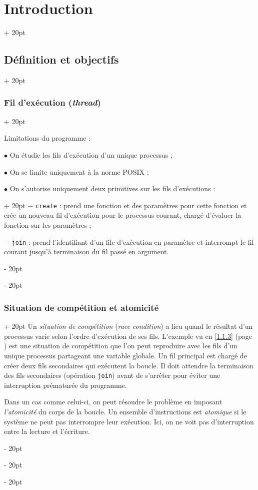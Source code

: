 \documentclass[a4paper, 12pt, twoside]{article}
\newcommand{\ind}[1][20pt]{\advance\leftskip + #1}
\newcommand{\deind}[1][20pt]{\advance\leftskip - #1}
\newenvironment{indt}[2][20pt]{#2 \par \ind[#1]}{\par \deind} %
\begin{document}
\begin{indt}{\section{Introduction}}
\begin{indt}{\subsection{Définition et objectifs}}
\begin{indt}{\subsubsection{Fil d'exécution (\textit{thread})}}
                \vspace{12pt}
                
                Limitations du programme :

                $\bullet$ On étudie les fils d'exécution d'un unique processus ;

                $\bullet$ On se limite uniquement à la norme POSIX ;

                \begin{indt}{$\bullet$ On s'autorise uniquement deux primitives sur les fils d'exécutions :}
                    $-$ \texttt{create} : prend une fonction et des paramètres pour cette fonction et crée un nouveau fil d'exécution pour le processus courant, chargé d'évaluer la fonction sur les paramètres ;

                    $-$ \texttt{join} : prend l'identifiant d'un file d'exécution en paramètre et interrompt le fil courant jusqu'à terminaison du fil passé en argument.
                \end{indt}
            \end{indt}

            \vspace{12pt}
            
            \begin{indt}{\subsubsection{Situation de compétition et atomicité}}
                Un \textit{situation de compétition} (\textit{race condition}) a lieu quand le résultat d'un processus varie selon l'ordre d'exécution de ses fils. L'exemple vu en \ref{1.1.3} (page \pageref{1.1.3}) est une situation de compétition que l'on peut reproduire avec les fils d'un unique processus partageant une variable globale.
                Un fil principal est chargé de créer deux fils secondaires qui exécutent la boucle.
                Il doit attendre la terminaison des fils secondaires (opération \texttt{join}) avant de s'arrêter pour éviter une interruption prématurée du programme.

                Dans un cas comme celui-ci, on peut résoudre le problème en imposant \textit{l'atomicité} du corps de la boucle. Un ensemble d'instructions est \textit{atomique} si le système ne peut pas interrompre leur exécution. Ici, on ne voit pas d'interruption entre la lecture et l'écriture.
            \end{indt}


\end{indt}
\end{indt}
\end{document}
